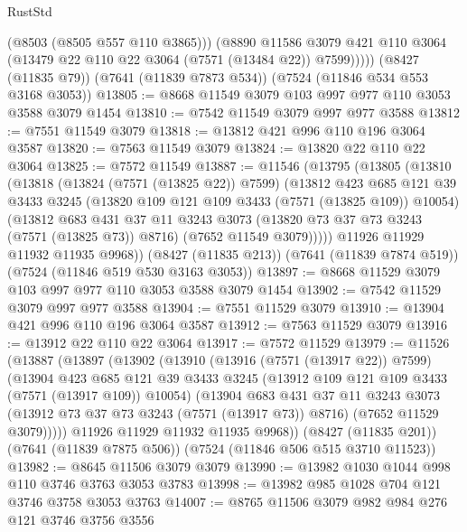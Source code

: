\begin{lexlean}{RustStd}
\begin{coremodule}
            (@8503 (@8505 @557 @110 @3865)))
          (@8890
            @11586
            @3079
            @421
            @110
            @3064
            (@13479 @22 @110 @22 @3064 (@7571 (@13484 @22)) @7599)))))
    (@8427 (@11835 @79))
    (@7641 (@11839 @7873 @534))
    (@7524 (@11846 @534 @553 @3168 @3053))
@13805 := @8668 @11549 @3079 @103 @997 @977 @110 @3053 @3588 @3079 @1454
@13810 := @7542 @11549 @3079 @997 @977 @3588
@13812 := @7551 @11549 @3079
@13818 := @13812 @421 @996 @110 @196 @3064 @3587
@13820 := @7563 @11549 @3079
@13824 := @13820 @22 @110 @22 @3064
@13825 := @7572 @11549
@13887 := @11546
    (@13795
      (@13805
        (@13810
          (@13818
            (@13824 (@7571 (@13825 @22)) @7599)
            (@13812
              @423
              @685
              @121
              @39
              @3433
              @3245
              (@13820 @109 @121 @109 @3433 (@7571 (@13825 @109)) @10054)
              (@13812
                @683
                @431
                @37
                @11
                @3243
                @3073
                (@13820 @73 @37 @73 @3243 (@7571 (@13825 @73)) @8716)
                (@7652 @11549 @3079)))))
        @11926
        @11929
        @11932
        @11935
        @9968))
    (@8427 (@11835 @213))
    (@7641 (@11839 @7874 @519))
    (@7524 (@11846 @519 @530 @3163 @3053))
@13897 := @8668 @11529 @3079 @103 @997 @977 @110 @3053 @3588 @3079 @1454
@13902 := @7542 @11529 @3079 @997 @977 @3588
@13904 := @7551 @11529 @3079
@13910 := @13904 @421 @996 @110 @196 @3064 @3587
@13912 := @7563 @11529 @3079
@13916 := @13912 @22 @110 @22 @3064
@13917 := @7572 @11529
@13979 := @11526
    (@13887
      (@13897
        (@13902
          (@13910
            (@13916 (@7571 (@13917 @22)) @7599)
            (@13904
              @423
              @685
              @121
              @39
              @3433
              @3245
              (@13912 @109 @121 @109 @3433 (@7571 (@13917 @109)) @10054)
              (@13904
                @683
                @431
                @37
                @11
                @3243
                @3073
                (@13912 @73 @37 @73 @3243 (@7571 (@13917 @73)) @8716)
                (@7652 @11529 @3079)))))
        @11926
        @11929
        @11932
        @11935
        @9968))
    (@8427 (@11835 @201))
    (@7641 (@11839 @7875 @506))
    (@7524 (@11846 @506 @515 @3710 @11523))
@13982 := @8645 @11506 @3079 @3079
@13990 := @13982 @1030 @1044 @998 @110 @3746 @3763 @3053 @3783
@13998 := @13982 @985 @1028 @704 @121 @3746 @3758 @3053 @3763
@14007 := @8765 @11506 @3079 @982 @984 @276 @121 @3746 @3756 @3556

\end{coremodule}
\end{lexlean}
